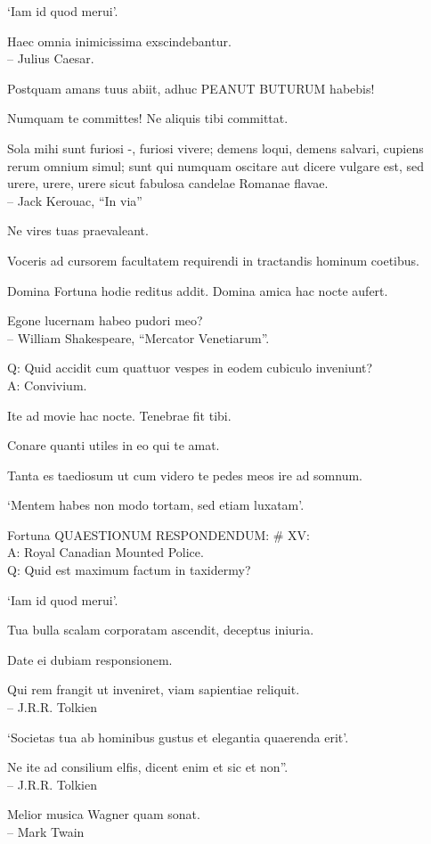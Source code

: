 \documentclass[titlepage,12pt]{memoir}
\begin{document}
‘Iam id quod merui’.

Haec omnia inimicissima exscindebantur.
\\-- Julius Caesar.

Postquam amans tuus abiit, adhuc PEANUT BUTURUM habebis!

Numquam te committes! Ne aliquis tibi committat.

Sola mihi sunt furiosi -, furiosi vivere;
demens loqui, demens salvari, cupiens rerum omnium simul;
sunt qui numquam oscitare aut dicere vulgare est, sed urere, urere, urere
sicut fabulosa candelae Romanae flavae.
\\-- Jack Kerouac, “In via”

Ne vires tuas praevaleant.

Voceris ad cursorem facultatem requirendi in tractandis hominum coetibus.

Domina Fortuna hodie reditus addit. Domina amica hac nocte aufert.

Egone lucernam habeo pudori meo?
\\-- William Shakespeare, “Mercator Venetiarum”.

Q: Quid accidit cum quattuor vespes in eodem cubiculo inveniunt?\\
A: Convivium.

Ite ad movie hac nocte. Tenebrae fit tibi.

Conare quanti utiles in eo qui te amat.

Tanta es taediosum ut cum videro te pedes meos ire ad somnum.

‘Mentem habes non modo tortam, sed etiam luxatam’.

Fortuna QUAESTIONUM RESPONDENDUM: \# XV:\\
A: Royal Canadian Mounted Police.
\\Q: Quid est maximum factum in taxidermy?

‘Iam id quod merui’.

Tua bulla scalam corporatam ascendit, deceptus iniuria.

Date ei dubiam responsionem.

Qui rem frangit ut inveniret, viam sapientiae reliquit.
\\-- J.R.R. Tolkien

‘Societas tua ab hominibus gustus et elegantia quaerenda erit’.

Ne ite ad consilium elfis, dicent enim et sic et non”.
\\-- J.R.R. Tolkien

Melior musica Wagner quam sonat.
\\-- Mark Twain
\end{document}
